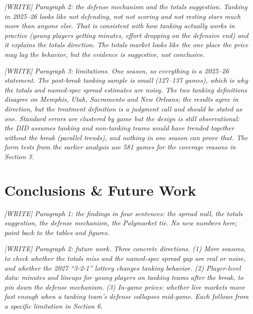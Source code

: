 \documentclass[12pt,letterpaper]{article}
\newcommand{\writeprompt}[1]{{\color{gray}\textit{[WRITE] #1}}}
\begin{document}
\writeprompt{Paragraph 2: the defense mechanism and the totals suggestion.
Tanking in 2025--26 looks like not defending, not not scoring and not
resting stars much more than anyone else. That is consistent with how
tanking actually works in practice (young players getting minutes, effort
dropping on the defensive end) and it explains the totals direction. The
totals market looks like the one place the price may lag the behavior, but
the evidence is suggestive, not conclusive.}

\writeprompt{Paragraph 3: limitations. One season, so everything is a
2025--26 statement. The post-break tanking sample is small (127--137
games), which is why the totals and named-spec spread estimates are noisy.
The two tanking definitions disagree on Memphis, Utah, Sacramento and New
Orleans; the results agree in direction, but the treatment definition is a
judgment call and should be stated as one. Standard errors are clustered by
game but the design is still observational: the DID assumes tanking and
non-tanking teams would have trended together without the break (parallel
trends), and nothing in one season can prove that. The form tests from the
earlier analysis use 581 games for the coverage reasons in Section 3.}

\section{Conclusions \& Future Work}

\writeprompt{Paragraph 1: the findings in four sentences: the spread null,
the totals suggestion, the defense mechanism, the Polymarket tie. No new
numbers here; point back to the tables and figures.}

\writeprompt{Paragraph 2: future work. Three concrete directions. (1) More
seasons, to check whether the totals miss and the named-spec spread gap are
real or noise, and whether the 2027 ``3-2-1'' lottery changes tanking
behavior. (2) Player-level data: minutes and lineups for young players on
tanking teams after the break, to pin down the defense mechanism. (3)
In-game prices: whether live markets move fast enough when a tanking team's
defense collapses mid-game. Each follows from a specific limitation in
Section 6.}



\makereference


\end{document}

